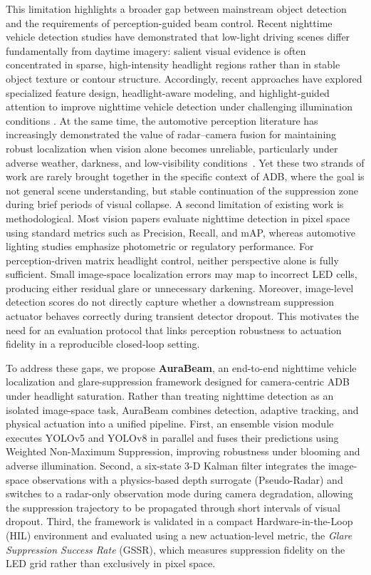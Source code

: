\documentclass[pdflatex,sn-mathphys-num]{sn-jnl}%
\theoremstyle{thmstyleone}%
\theoremstyle{thmstyletwo}%
\theoremstyle{thmstylethree}%
\begin{document}
This limitation highlights a broader gap between mainstream object detection and the requirements of perception-guided beam control. Recent nighttime vehicle detection studies have demonstrated that low-light driving scenes differ fundamentally from daytime imagery: salient visual evidence is often concentrated in sparse, high-intensity headlight regions rather than in stable object texture or contour structure.
Accordingly, recent approaches have explored specialized feature design, headlight-aware modeling, and highlight-guided attention to improve nighttime vehicle detection under challenging illumination conditions \cite{zhang2024vision,lashkov2025machine,song2025highlightnet}.
At the same time, the automotive perception literature has increasingly
demonstrated the value of radar--camera fusion for maintaining robust
localization when vision alone becomes unreliable, particularly under
adverse weather, darkness, and low-visibility
conditions~\cite{yao2023radar,deng2025advances,xiao2025radar}.
Yet these two strands of work are rarely brought together in the specific context of ADB, where the goal is not general scene understanding, but stable continuation of the suppression zone during brief periods of visual collapse. A second limitation of existing work is methodological. Most vision papers evaluate nighttime detection in pixel space using standard metrics such as Precision, Recall, and mAP, whereas automotive lighting studies emphasize photometric or regulatory performance. For perception-driven matrix headlight control, neither perspective alone is
fully sufficient. Small image-space localization errors may map to incorrect LED cells, producing either residual glare or unnecessary darkening. Moreover, image-level detection scores do not directly capture whether a downstream suppression actuator behaves correctly during transient detector dropout. This motivates the need for an
evaluation protocol that links perception robustness to actuation fidelity in a reproducible closed-loop setting.

To address these gaps, we propose  \textbf{AuraBeam}, an end-to-end nighttime vehicle localization and glare-suppression framework designed for camera-centric ADB under headlight saturation. Rather than treating
nighttime detection as an isolated image-space task, AuraBeam combines detection, adaptive tracking, and physical actuation into a unified pipeline. First, an ensemble vision module executes YOLOv5 and YOLOv8 in parallel and fuses their predictions using Weighted Non-Maximum
Suppression, improving robustness under blooming and adverse illumination. Second, a six-state 3-D Kalman filter integrates the
image-space observations with a physics-based depth surrogate (Pseudo-Radar) and switches to a radar-only observation mode during
camera degradation, allowing the suppression trajectory to be propagated through short intervals of visual dropout. Third, the framework is validated in a compact Hardware-in-the-Loop (HIL) environment and evaluated using a new actuation-level metric, the \emph{Glare Suppression Success Rate} (GSSR), which measures suppression fidelity on the LED grid rather than exclusively in pixel space.
\end{document}
